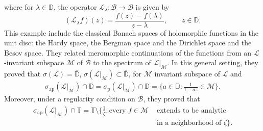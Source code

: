 \documentclass[reqno]{amsproc}
\numberwithin{equation}{section}
\theoremstyle{remark}
\newcommand*{\mcal}{\mathcal{M}}
\newcommand{\disc}{\mathbb{D}}
\theoremstyle{definition}
\newcommand{\lein}{\mathcal{L}}
\newcommand{\bspace}{\mathcal{B}}
\newcommand{\kol}{\mathbb{T}}
\begin{document}
where for $\lambda\in \disc$, the operator $\lein_\lambda\colon \bspace \to \bspace$ is given by
\begin{equation*}
    (\lein_\lambda f)(z) = \frac{f(z)-f(\lambda)}{z-\lambda}, \qquad z \in \disc.
\end{equation*}
This example include the classical Banach spaces of holomorphic functions in the unit disc: the Hardy space, the Bergman space and the 
Dirichlet space and the Besov space. They  related meromorphic continuations of the functions from  an $\lein$-invariant subspace $\mcal$ of $\bspace$ to the spectrum of $\lein|_\mcal$. 
In this general setting, they proved  that $\sigma(\lein)=\overline{\disc}$, 
$\sigma(\lein|_\mcal)\subset \overline{\disc}$, for $\mcal$ invariant subspace of $\lein$ and
    \begin{align*}
    \sigma_{\text{ap}}(\lein|_\mcal)\cap \disc = \sigma_{\text{p}}(\lein|_\mcal)\cap \disc  =\{a\in \disc \colon \frac{1}{1-az}\in \mcal \}.
\end{align*}
Moreover, under a regularity condition
on $\bspace$, they proved that
\begin{align*}
\sigma_{\text{ap}}(\lein|_\mcal)\cap\kol=\kol\setminus\{\frac{1}{\zeta}\colon \text{every } f\in\mcal &\text{ extends to be analytic} \\& \text{ in a neighborhood of } \zeta \}.
\end{align*}
\end{document}
